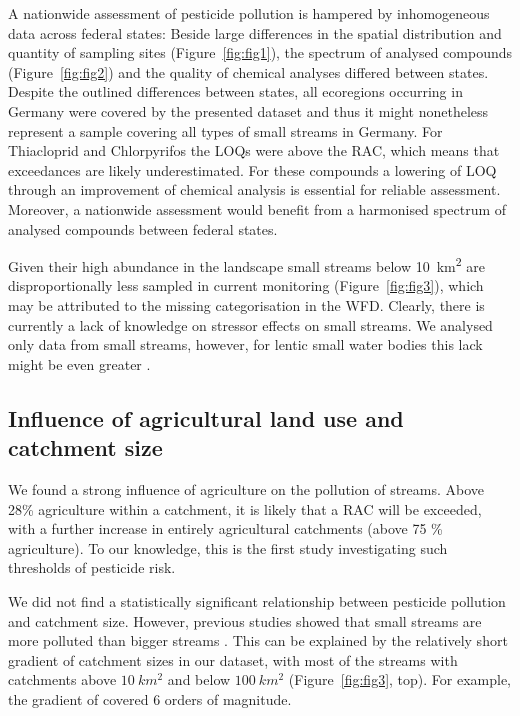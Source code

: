 \documentclass[journal=esthag,manuscript=article]{achemso}
\begin{document}
A nationwide assessment of pesticide pollution is hampered by inhomogeneous data across federal states:
Beside large differences in the spatial distribution and quantity of sampling sites (Figure~\ref{fig:fig1}), the spectrum of analysed compounds (Figure~\ref{fig:fig2}) and the quality of chemical analyses differed between states. 
Despite the outlined differences between states, all ecoregions occurring in Germany \citep{illies1978limnofauna,abell2008freshwater} were covered by the presented dataset and thus it might nonetheless represent a sample covering all types of small streams in Germany. 
For Thiacloprid and Chlorpyrifos the LOQs were above the RAC, which means that exceedances are likely underestimated.
For these compounds a lowering of LOQ through an improvement of chemical analysis is essential for reliable assessment.
Moreover, a nationwide assessment would benefit from a harmonised spectrum of analysed compounds between federal states. 

Given their high abundance in the landscape \citep{nadeau_hydrological_2007} small streams below 10~km\textsuperscript{2} are disproportionally less sampled in current monitoring (Figure~\ref{fig:fig3}), which may be attributed to the missing categorisation in the WFD. 
Clearly, there is currently a lack of knowledge on stressor effects on small streams.
We analysed only data from small streams, however, for lentic small water bodies this lack might be even greater \citep{lorenz_specifics_2016}. 



\subsection{Influence of agricultural land use and catchment size}
We found a strong influence of agriculture on the pollution of streams.
Above 28\% agriculture within a catchment, it is likely that a RAC will be exceeded, with a further increase in entirely agricultural catchments (above 75 \% agriculture).
To our knowledge, this is the first study investigating such thresholds of pesticide risk.

We did not find a statistically significant relationship between pesticide pollution and catchment size.
However, previous studies showed that small streams are more polluted than bigger streams \citep{schulz_field_2004,stehle_pesticide_2015,knauer_pesticides_2016}.
This can be explained by the relatively short gradient of catchment sizes in our dataset, with most of the streams with catchments above $10~km^2$ and below $100~km^2$ (Figure~\ref{fig:fig3}, top).
For example, the gradient of \citet{schulz_field_2004} covered 6 orders of magnitude.
\end{document}
